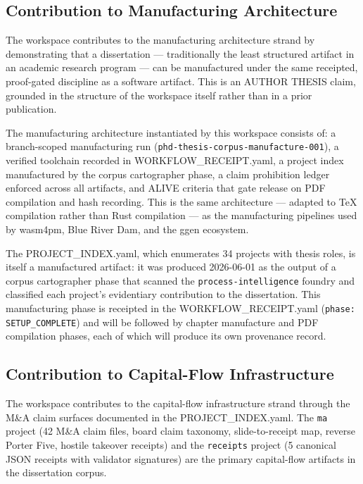 \subsection{Contribution to Manufacturing Architecture}
\label{sec:phd-thesis-contribution-manufacturing}

The workspace contributes to the manufacturing architecture strand by demonstrating that a
dissertation --- traditionally the least structured artifact in an academic research program
--- can be manufactured under the same receipted, proof-gated discipline as a software
artifact. This is an AUTHOR THESIS claim, grounded in the structure of the workspace itself
rather than in a prior publication.

The manufacturing architecture instantiated by this workspace consists of: a branch-scoped
manufacturing run (\texttt{phd-thesis-corpus-manufacture-001}), a verified toolchain
recorded in WORKFLOW\_RECEIPT.yaml, a project index manufactured by the corpus cartographer
phase, a claim prohibition ledger enforced across all artifacts, and ALIVE criteria that gate
release on PDF compilation and hash recording. This is the same architecture --- adapted to
TeX compilation rather than Rust compilation --- as the manufacturing pipelines used by
wasm4pm, Blue River Dam, and the ggen ecosystem.

The PROJECT\_INDEX.yaml, which enumerates 34 projects with thesis roles, is itself a
manufactured artifact: it was produced 2026-06-01 as the output of a corpus cartographer
phase that scanned the \texttt{process-intelligence} foundry and classified each project's
evidentiary contribution to the dissertation. This manufacturing phase is receipted in the
WORKFLOW\_RECEIPT.yaml (\texttt{phase: SETUP\_COMPLETE}) and will be followed by chapter
manufacture and PDF compilation phases, each of which will produce its own provenance record.

\subsection{Contribution to Capital-Flow Infrastructure}
\label{sec:phd-thesis-contribution-capital}

The workspace contributes to the capital-flow infrastructure strand through the M\&A claim
surfaces documented in the PROJECT\_INDEX.yaml. The \texttt{ma} project (42 M\&A claim files,
board claim taxonomy, slide-to-receipt map, reverse Porter Five, hostile takeover receipts)
and the \texttt{receipts} project (5 canonical JSON receipts with validator signatures) are
the primary capital-flow artifacts in the dissertation corpus.

